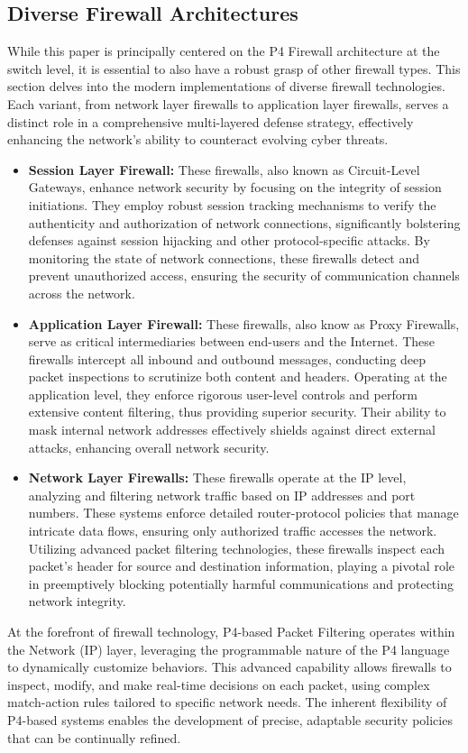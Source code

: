 \subsection{Diverse Firewall Architectures}
While this paper is principally centered on the P4 Firewall architecture at the switch level, it is essential to also have a robust grasp of other firewall types. This section delves into the modern implementations of diverse firewall technologies. Each variant, from network layer firewalls to application layer firewalls, serves a distinct role in a comprehensive multi-layered defense strategy, effectively enhancing the network's ability to counteract evolving cyber threats.
\begin{itemize}
    \item \textbf{Session Layer Firewall:} These firewalls, also known as Circuit-Level Gateways, enhance network security by focusing on the integrity of session initiations. They employ robust session tracking mechanisms to verify the authenticity and authorization of network connections, significantly bolstering defenses against session hijacking and other protocol-specific attacks. By monitoring the state of network connections, these firewalls detect and prevent unauthorized access, ensuring the security of communication channels across the network.
    \item \textbf{Application Layer Firewall:} These firewalls, also know as Proxy Firewalls, serve as critical intermediaries between end-users and the Internet. These firewalls intercept all inbound and outbound messages, conducting deep packet inspections to scrutinize both content and headers. Operating at the application level, they enforce rigorous user-level controls and perform extensive content filtering, thus providing superior security. Their ability to mask internal network addresses effectively shields against direct external attacks, enhancing overall network security.
    \item \textbf{Network Layer Firewalls:} These firewalls operate at the IP level, analyzing and filtering network traffic based on IP addresses and port numbers. These systems enforce detailed router-protocol policies that manage intricate data flows, ensuring only authorized traffic accesses the network. Utilizing advanced packet filtering technologies, these firewalls inspect each packet's header for source and destination information, playing a pivotal role in preemptively blocking potentially harmful communications and protecting network integrity.
\end{itemize}
At the forefront of firewall technology, P4-based Packet Filtering operates within the Network (IP) layer, leveraging the programmable nature of the P4 language to dynamically customize behaviors. This advanced capability allows firewalls to inspect, modify, and make real-time decisions on each packet, using complex match-action rules tailored to specific network needs. The inherent flexibility of P4-based systems enables the development of precise, adaptable security policies that can be continually refined.
